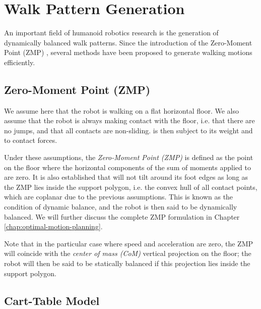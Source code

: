 \section{Walk Pattern Generation}
\label{sec:chap1-pattern-generator}

An important field of humanoid robotics research is the generation of
dynamically balanced walk patterns. Since the introduction of the
Zero-Moment Point (ZMP) \cite{vukobratovic1969contribution}, several
methods have been proposed to generate walking motions efficiently.

\subsection{Zero-Moment Point (ZMP)}
\label{subsec:chap1-zmp}

We assume here that the robot {\robot} is walking on a flat
horizontal floor. We also assume that the robot is always making
contact with the floor, i.e. that there are no jumps, and that all
contacts are non-sliding. {\robot} is then subject to its
weight and to contact forces.

Under these assumptions, the \emph{Zero-Moment Point (ZMP)}
\cite{vukobratovic1969contribution} is defined as the point on the
floor where the horizontal components of the sum of moments applied to
{\robot} are zero. It is also established that
{\robot} will not tilt around its foot edges as long as the
ZMP lies inside the support polygon, i.e. the convex hull of all
contact points, which are coplanar due to the previous
assumptions. This is known as the condition of dynamic balance, and
the robot {\robot} is then said to be dynamically balanced. We
will further discuss the complete ZMP formulation in Chapter
\ref{chap:optimal-motion-planning}.

Note that in the particular case where speed and acceleration are
zero, the ZMP will coincide with the \emph{center of mass (CoM)}
vertical projection on the floor; the robot {\robot} will then be said
to be statically balanced if this projection lies inside the support
polygon.

\subsection{Cart-Table Model}
\label{subsec:chap1-cart-table}

